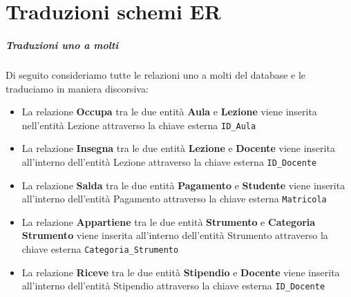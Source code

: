 \chapter{Traduzioni schemi ER}
\paragraph{Traduzioni uno a molti} Di seguito consideriamo tutte le relazioni uno a molti del database e le traduciamo in maniera discorsiva: 
\begin{itemize}
    \item La relazione \textbf{Occupa} tra le due entità \textbf{Aula} e \textbf{Lezione} viene inserita nell'entità Lezione attraverso la chiave esterna \texttt{ID\_Aula}
    \item La relazione \textbf{Insegna} tra le due entità \textbf{Lezione} e \textbf{Docente} viene inserita all'interno dell'entità Lezione attraverso la chiave esterna \texttt{ID\_Docente} 
    \item La relazione \textbf{Salda} tra le due entità \textbf{Pagamento} e \textbf{Studente} viene inserita all'interno dell'entità Pagamento attraverso la chiave esterna \texttt{Matricola}
    \item La relazione \textbf{Appartiene} tra le due entità \textbf{Strumento} e \textbf{Categoria Strumento} viene inserita all'interno dell'entità Strumento attraverso la chiave esterna \texttt{Categoria\_Strumento}
    \item La relazione \textbf{Riceve} tra le due entità \textbf{Stipendio} e \textbf{Docente} viene inserita all'interno dell'entità Stipendio attraverso la chiave esterna \texttt{ID\_Docente}
\end{itemize}
\newpage
